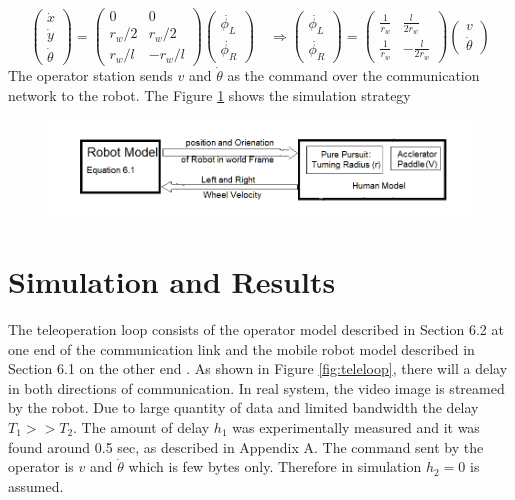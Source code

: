 \begin{equation}
\begin{pmatrix}
\dot{x}\\
\dot{y}\\
\dot{\theta}
\end{pmatrix}
=
\begin{pmatrix}
0 & 0 \\
r_w/2 & r_w/2 \\
r_w/l & -r_w/l
\end{pmatrix}
\begin{pmatrix}
\dot{\phi_L}\\
\dot{\phi_R}
\end{pmatrix}
\quad \Rightarrow 
\begin{pmatrix}
\dot{\phi_L}\\
\dot{\phi_R}
\end{pmatrix} =
\begin{pmatrix}
\frac{1}{r_w} & \frac{l}{2r_w} \\
\frac{1}{r_w} & -\frac{l}{2r_w}
\end{pmatrix}
\begin{pmatrix}
v\\
\dot{\theta}
\end{pmatrix}
\end{equation}
The operator station  sends $v$ and $\dot{\theta}$ as the command over the  communication network to the robot. The Figure \ref{fig:SimBlock1} shows the simulation strategy 
\begin{figure}[h]
	\includegraphics[width=\linewidth,keepaspectratio]{Chapter6/fig/SimulationModel}
	\label{fig:SimBlock1} 
\end{figure}

  


\section{Simulation and Results }

The teleoperation loop consists of the operator model described in Section 6.2 at one end of the communication link and the mobile robot model described in Section 6.1 on the other end . As shown in Figure \ref{fig:teleloop}, there will a delay in both directions of communication. In real system, the video image is streamed  by the robot. Due to large quantity of data and limited bandwidth the delay $T_1>>T_2$. The amount of delay $h_1$ was experimentally measured  and it was found around 0.5 sec, as described in Appendix A. The command sent by the operator is  $v$ and $\dot{\theta}$ which is few bytes only.  Therefore in simulation  $h_2=0$ is assumed.


